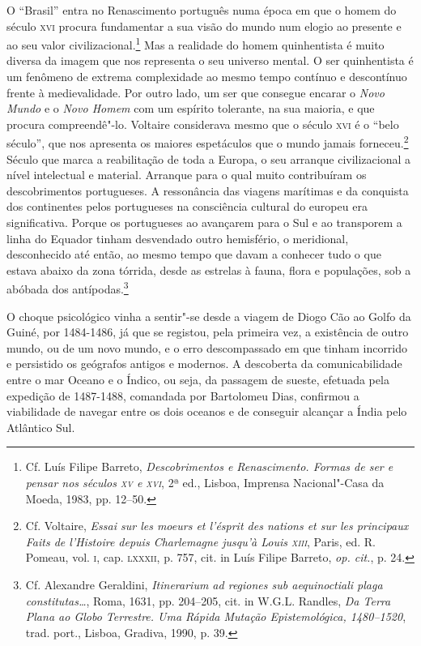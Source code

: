 O ``Brasil'' entra no Renascimento português numa época em que o
homem do século \textsc{xvi} procura fundamentar a sua visão do mundo num elogio
ao presente e ao seu valor civilizacional.\footnote{ Cf. Luís
Filipe Barreto, \textit{Descobrimentos e Renascimento. Formas de ser e
pensar nos séculos \textsc{xv} e \textsc{xvi}}, 2ª ed., Lisboa, Imprensa Nacional"-Casa da
Moeda, 1983, pp. 12--50.} Mas a realidade do homem quinhentista é 
muito diversa da imagem que nos representa o seu
universo mental. O ser quinhentista é um fenômeno de extrema
complexidade ao mesmo tempo contínuo e descontínuo frente à
medievalidade. Por outro lado, um ser que consegue encarar o
\textit{Novo Mundo} e o \textit{Novo Homem} com um espírito tolerante,
na sua maioria, e que procura compreendê"-lo. Voltaire considerava
mesmo que o século \textsc{xvi} é o ``belo século'', que nos apresenta os maiores
espetáculos que o mundo jamais forneceu.\footnote{ Cf. Voltaire,
\textit{Essai sur les moeurs et l'ésprit des nations et sur
les principaux Faits de l'Histoire depuis Charlemagne jusqu'à Louis
\textsc{xiii}}, Paris, ed. R. Pomeau, vol. \textsc{i}, cap. \textsc{lxxxii}, p. 757, cit. in Luís
Filipe Barreto, \textit{op. cit.}, p. 24.} Século que marca a
reabilitação de toda a Europa, o seu arranque civilizacional a nível
intelectual e material. 
Arranque para o qual muito contribuíram os descobrimentos
portugueses. A ressonância das viagens marítimas e da conquista dos
continentes pelos portugueses na consciência cultural do europeu era
significativa. Porque os portugueses ao avançarem para o Sul e ao
transporem a linha do Equador tinham desvendado outro hemisfério, o
meridional, desconhecido até então, ao mesmo tempo que davam a
conhecer tudo o que estava abaixo da zona tórrida, desde as estrelas à
fauna, flora e populações, sob a abóbada dos antípodas.\footnote{ Cf. Alexandre 
Geraldini, \textit{Itinerarium ad regiones sub
aequinoctiali plaga constitutas\ldots}, Roma, 1631, pp. 204--205, cit. in
W.G.L. Randles, \textit{Da Terra Plana ao Globo Terrestre. Uma Rápida
Mutação Epistemológica, 1480--1520}, trad. port., Lisboa,
Gradiva, 1990, p. 39.} 

O choque psicológico vinha a sentir"-se desde a viagem de Diogo Cão ao
Golfo da Guiné, por 1484-1486, já que se registou, pela primeira vez, a
existência de outro mundo, ou de um novo mundo, e o erro descompassado
em que tinham incorrido e persistido os geógrafos antigos e modernos. A
descoberta da comunicabilidade entre o mar Oceano e o Índico, ou seja,
da passagem de sueste, efetuada pela expedição de 1487-1488, comandada
por Bartolomeu Dias, confirmou a viabilidade de navegar entre os dois
oceanos e de conseguir alcançar a Índia pelo Atlântico Sul. 

